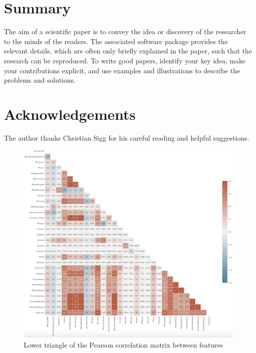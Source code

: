 \documentclass[10pt,conference,compsocconf]{IEEEtran}
\begin{document}
\section{Summary}

The aim of a scientific paper is to convey the idea or discovery of
the researcher to the minds of the readers. The associated software
package provides the relevant details, which are often only briefly
explained in the paper, such that the research can be reproduced.
To write good papers, identify your key idea, make your contributions
explicit, and use examples and illustrations to describe the problems
and solutions.

\section*{Acknowledgements}
The author thanks Christian Sigg for his careful reading and helpful
suggestions.





\begin{figure}[h]
  \includegraphics[scale = 0.75]{corr_matrix.png}
  \caption{Lower triangle of the Pearson correlation matrix between features}
  \label{corr_matrix}
\end{figure}
\end{document}
